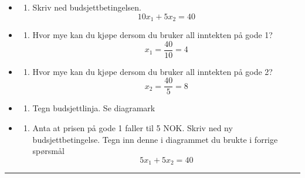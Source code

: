 \documentclass[
  letterpaper,
  DIV=11,
  numbers=noendperiod]{scrartcl}
\providecommand{\tightlist}{%
  \setlength{\itemsep}{0pt}\setlength{\parskip}{0pt}}\usepackage{longtable,booktabs,array}
\begin{document}
\begin{itemize}
\tightlist
\item
  \begin{enumerate}
  \def\labelenumi{(\alph{enumi})}
  \tightlist
  \item
    Skriv ned budsjettbetingelsen. \begin{equation*}
    10x_{1}+5x_{2}=40
    \end{equation*}
  \end{enumerate}
\item
  \begin{enumerate}
  \def\labelenumi{(\alph{enumi})}
  \setcounter{enumi}{1}
  \tightlist
  \item
    Hvor mye kan du kjøpe dersom du bruker all inntekten på gode 1?
    \begin{equation*}
    x_{1} = \frac{40}{10} = 4
    \end{equation*}
  \end{enumerate}
\item
  \begin{enumerate}
  \def\labelenumi{(\alph{enumi})}
  \setcounter{enumi}{2}
  \tightlist
  \item
    Hvor mye kan du kjøpe dersom du bruker all inntekten på gode 2?
    \begin{equation*}
    x_{2} = \frac{40}{5} = 8
    \end{equation*}
  \end{enumerate}
\item
  \begin{enumerate}
  \def\labelenumi{(\alph{enumi})}
  \setcounter{enumi}{3}
  \tightlist
  \item
    Tegn budsjettlinja. Se diagramark
  \end{enumerate}
\item
  \begin{enumerate}
  \def\labelenumi{(\alph{enumi})}
  \setcounter{enumi}{4}
  \tightlist
  \item
    Anta at prisen på gode 1 faller til 5 NOK. Skriv ned ny
    budsjettbetingelse. Tegn inn denne i diagrammet du brukte i forrige
    spørsmål \begin{equation*}
    5x_{1}+5x_{2}=40
    \end{equation*}
  \end{enumerate}
\end{itemize}

\begin{center}\rule{0.5\linewidth}{0.5pt}\end{center}
\end{document}
